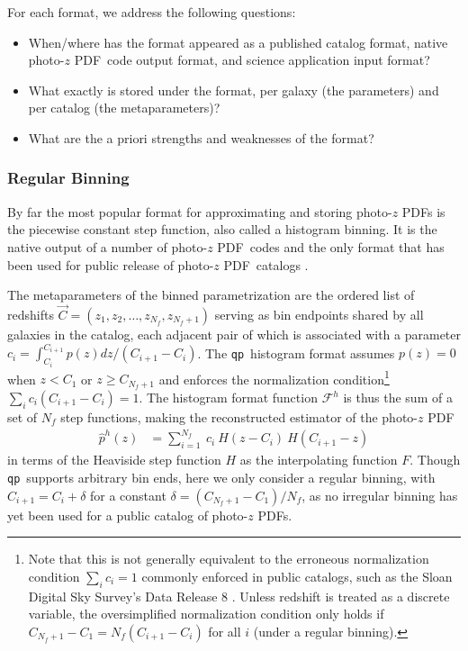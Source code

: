 \documentclass[\docopts]{\docclass}
\newcommand{\qp}{\texttt{qp}}
\newcommand{\pz}{photo-$z$ PDF}
\begin{document}
For each format, we address the following questions:
\begin{itemize}[partopsep=0pt, parsep=0pt, itemsep=5pt]
  \item When/where has the format appeared as a published catalog format, 
native \pz\ code output format, and science application input format?
  \item What exactly is stored under the format, per galaxy (the parameters) 
and per catalog (the metaparameters)?
  \item What are the a priori strengths and weaknesses of the format?
\end{itemize}

\subsubsection{Regular Binning}
\label{sec:bins}

By far the most popular format for approximating and storing \pz s is the 
piecewise constant step function, also called a histogram binning.
It is the native output of a number of \pz\ codes 
\citep{carrasco_kind_somz:_2014, sadeh_annz2:_2016, cavuoti_metaphor:_2017} and 
the only format that has been used for public release of \pz\ catalogs 
\citep{sheldon_photometric_2012, tanaka_photometric_2017, jong_third_2017}.

The metaparameters of the binned parametrization are the ordered list of 
redshifts $\vec{C} = (z_{1}, z_{2}, \dots, z_{N_{f}}, z_{N_{f}+1})$ serving as 
bin endpoints shared by all galaxies in the catalog, each adjacent pair of 
which is associated with a parameter $c_{i} = \int_{C_{i}}^{C_{i+1}} p(z) dz / 
(C_{i+1} - C_{i})$.
The \qp\ histogram format assumes $p(z)=0$ when $z<C_{1}$ or $z\geq 
C_{N_{f}+1}$ and enforces the normalization condition\footnote{
Note that this is not generally equivalent to the erroneous normalization 
condition $\sum_{i} c_{i} = 1$ commonly enforced in public catalogs, such as 
the Sloan Digital Sky Survey's Data Release 8 \citep{sheldon_photometric_2012}.
Unless redshift is treated as a discrete variable, the oversimplified 
normalization condition only holds if $C_{N_{f}+1} - C_{1} = N_{f} (C_{i+1} - 
C_{i})$ for all $i$ (under a regular binning).
}
$\sum_{i} c_{i} (C_{i+1} - C_{i}) = 1$.
The histogram format function $\mathcal{F}^{h}$ is thus the sum of a set of 
$N_{f}$ step functions, making the reconstructed estimator of the \pz
\begin{align}
  \label{eq:binned}
  \hat{p}^{h}(z) &= \sum_{i=1}^{N_{f}}\ c_{i}\ H(z - C_{i})\ H(C_{i+1} - z)
\end{align}
in terms of the Heaviside step function $H$ as the interpolating function $F$.
Though \qp\ supports arbitrary bin ends, here we only consider a regular 
binning, with $C_{i+1} = C_{i} + \delta$ for a constant $\delta = (C_{N_{f}+1} 
- C_{1}) / N_{f}$, as no irregular binning has yet been used for a public 
catalog of \pz s.
\end{document}
